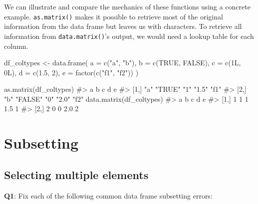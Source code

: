 \documentclass[
]{krantz}
\makeatletter
\newenvironment{Shaded}{\begin{snugshade}}{\end{snugshade}}
\newcommand{\CommentTok}[1]{\textcolor[rgb]{0.56,0.35,0.01}{\textit{#1}}}
\newcommand{\DataTypeTok}[1]{\textcolor[rgb]{0.13,0.29,0.53}{#1}}
\newcommand{\DecValTok}[1]{\textcolor[rgb]{0.00,0.00,0.81}{#1}}
\newcommand{\FloatTok}[1]{\textcolor[rgb]{0.00,0.00,0.81}{#1}}
\newcommand{\KeywordTok}[1]{\textcolor[rgb]{0.13,0.29,0.53}{\textbf{#1}}}
\newcommand{\NormalTok}[1]{#1}
\newcommand{\OtherTok}[1]{\textcolor[rgb]{0.56,0.35,0.01}{#1}}
\newcommand{\StringTok}[1]{\textcolor[rgb]{0.31,0.60,0.02}{#1}}
\newenvironment{kframe}{%
\medskip{}
\setlength{\fboxsep}{.8em}
 \def\at@end@of@kframe{}%
 \ifinner\ifhmode%
  \def\at@end@of@kframe{\end{minipage}}%
  \begin{minipage}{\columnwidth}%
 \fi\fi%
 \def\FrameCommand##1{\hskip\@totalleftmargin \hskip-\fboxsep
 \colorbox{shadecolor}{##1}\hskip-\fboxsep
     \hskip-\linewidth \hskip-\@totalleftmargin \hskip\columnwidth}%
 \MakeFramed {\advance\hsize-\width
   \@totalleftmargin\z@ \linewidth\hsize
   \@setminipage}}%
 {\par\unskip\endMakeFramed%
 \at@end@of@kframe}
\renewenvironment{Shaded}{\begin{kframe}}{\end{kframe}}
\renewcommand{\KeywordTok} [1]{\textcolor[rgb]{0.00,0.44,0.13}{{#1}}}
\renewcommand{\DataTypeTok}[1]{\textcolor[rgb]{0.56,0.13,0.00}{{#1}}}
\renewcommand{\DecValTok}  [1]{\textcolor[rgb]{0.25,0.63,0.44}{{#1}}}
\renewcommand{\FloatTok}   [1]{\textcolor[rgb]{0.25,0.63,0.44}{{#1}}}
\renewcommand{\StringTok}  [1]{\textcolor[rgb]{0.25,0.44,0.63}{{#1}}}
\renewcommand{\CommentTok} [1]{\textcolor[rgb]{0.38,0.63,0.69}{{#1}}}
\renewcommand{\OtherTok}   [1]{\textcolor[rgb]{0.00,0.44,0.13}{{#1}}}
\renewcommand{\NormalTok}  [1]{{#1}}
\makeatother
\begin{document}
We can illustrate and compare the mechanics of these functions using a concrete example. \texttt{as.matrix()} makes it possible to retrieve most of the original information from the data frame but leaves us with characters. To retrieve all information from \texttt{data.matrix()}'s output, we would need a lookup table for each column.

\begin{Shaded}
\begin{Highlighting}[]
\NormalTok{df_coltypes <-}\StringTok{ }\KeywordTok{data.frame}\NormalTok{(}
  \DataTypeTok{a =} \KeywordTok{c}\NormalTok{(}\StringTok{"a"}\NormalTok{, }\StringTok{"b"}\NormalTok{),}
  \DataTypeTok{b =} \KeywordTok{c}\NormalTok{(}\OtherTok{TRUE}\NormalTok{, }\OtherTok{FALSE}\NormalTok{),}
  \DataTypeTok{c =} \KeywordTok{c}\NormalTok{(1L, 0L),}
  \DataTypeTok{d =} \KeywordTok{c}\NormalTok{(}\FloatTok{1.5}\NormalTok{, }\DecValTok{2}\NormalTok{),}
  \DataTypeTok{e =} \KeywordTok{factor}\NormalTok{(}\KeywordTok{c}\NormalTok{(}\StringTok{"f1"}\NormalTok{, }\StringTok{"f2"}\NormalTok{))}
\NormalTok{)}

\KeywordTok{as.matrix}\NormalTok{(df_coltypes)}
\CommentTok{#>      a   b       c   d     e   }
\CommentTok{#> [1,] "a" "TRUE"  "1" "1.5" "f1"}
\CommentTok{#> [2,] "b" "FALSE" "0" "2.0" "f2"}
\KeywordTok{data.matrix}\NormalTok{(df_coltypes)}
\CommentTok{#>      a b c   d e}
\CommentTok{#> [1,] 1 1 1 1.5 1}
\CommentTok{#> [2,] 2 0 0 2.0 2}
\end{Highlighting}
\end{Shaded}

\hypertarget{subsetting}{%
\chapter{Subsetting}\label{subsetting}}


\hypertarget{selecting-multiple-elements}{%
\section{Selecting multiple elements}\label{selecting-multiple-elements}}

\textbf{{Q1}}: Fix each of the following common data frame subsetting errors:
\end{document}
